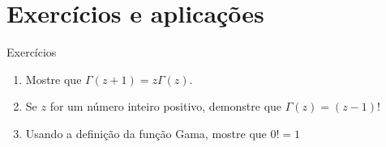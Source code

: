 \documentclass[
size=17pt,
paper=smartboard,
mode=present,
display=slidesnotes,
style=paintings,
nopagebreaks,
blackslide,
fleqn]{powerdot}
\begin{document}
   \section[ slide = false ]{Exercícios e aplicações}
      \begin{slide}[toc=]{Exercícios}
         \begin{enumerate}
		 \item  Mostre que $\Gamma(z+1) = z\Gamma(z)$.
		 \item  Se $z$ for um número inteiro positivo, demonstre que $\Gamma(z) = (z-1)!$
		 \item  Usando a definição da função Gama, mostre que $0!=1$
            \end{enumerate}
      \end{slide}
      
\end{document}
